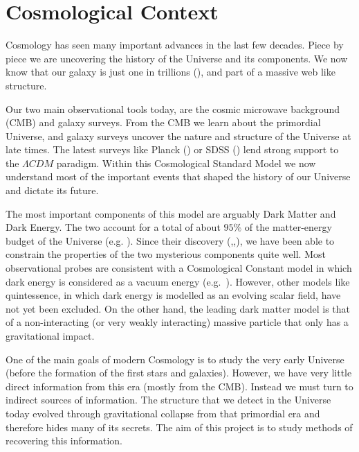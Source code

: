 
\section{Cosmological Context}

Cosmology has seen many important advances in the last few decades. Piece by piece we are uncovering the history of the Universe and its components. We now know that our galaxy is just one in trillions (\cite{2016ApJ...830...83C}), and part of a massive web like structure.

Our two main observational tools today, are the cosmic microwave background (CMB) and galaxy surveys. From the CMB we learn about the primordial Universe, and galaxy surveys uncover the nature and structure of the Universe at late times. The latest surveys like Planck (\cite{2016A&A...594A..13P}) or SDSS (\cite{PhysRevD.69.103501}) lend strong support to the $\Lambda CDM$ paradigm. Within this Cosmological Standard Model we now understand most of the important events that shaped the history of our Universe and dictate its future. 

The most important components of this model are arguably Dark Matter and Dark Energy. The two account for a total of about $95\%$ of the matter-energy budget of the Universe (e.g. \cite{2016A&A...594A..13P}). Since their discovery (\cite{Babcock_andromeda_rotation},\cite{1999ApJ...517..565P},\cite{Riess_accelerated_expansion}), we have been able to constrain the properties of the two mysterious components quite well. Most observational probes are consistent with a Cosmological Constant model in which dark energy is considered as a vacuum energy (e.g.~\cite{2016A&A...594A..13P}). However, other models like quintessence, in which dark energy is modelled as an evolving scalar field, have not yet been excluded. On the other hand, the leading dark matter model is that of a non-interacting (or very weakly interacting) massive particle that only has a gravitational impact.

One of the main goals of modern Cosmology is to study the very early Universe (before the formation of the first stars and galaxies). However, we have very little direct information from this era (mostly from the CMB). Instead we must turn to indirect sources of information. The structure that we detect in the Universe today evolved through gravitational collapse from that primordial era and therefore hides many of its secrets. The aim of this project is to study methods of recovering this information. 

